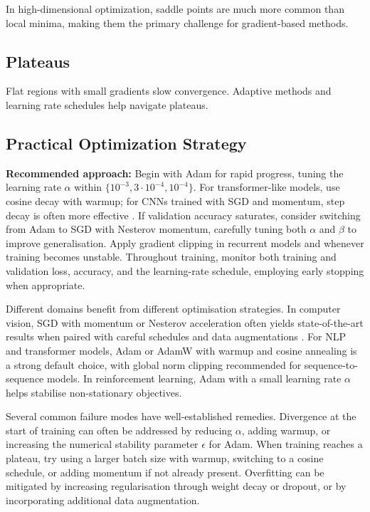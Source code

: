 In high-dimensional optimization, saddle points are much more common than local minima, making them the primary challenge for gradient-based methods.

\subsection{Plateaus}

Flat regions with small gradients slow convergence. Adaptive methods and learning rate schedules help navigate plateaus.

\subsection{Practical Optimization Strategy}

\textbf{Recommended approach:} Begin with Adam \cite{Kingma2014} for rapid progress, tuning the learning rate $\alpha$ within $\{10^{-3},3\cdot10^{-4},10^{-4}\}$. For transformer-like models, use cosine decay with warmup; for CNNs trained with SGD and momentum, step decay is often more effective \cite{WebOptimizationDLBook,D2LChapterOptimization,He2016}. If validation accuracy saturates, consider switching from Adam to SGD with Nesterov momentum, carefully tuning both $\alpha$ and $\beta$ to improve generalisation. Apply gradient clipping in recurrent models and whenever training becomes unstable. Throughout training, monitor both training and validation loss, accuracy, and the learning-rate schedule, employing early stopping when appropriate.

Different domains benefit from different optimisation strategies. In computer vision, SGD with momentum or Nesterov acceleration often yields state-of-the-art results when paired with careful schedules and data augmentations \cite{He2016}. For NLP and transformer models, Adam or AdamW with warmup and cosine annealing is a strong default choice, with global norm clipping recommended for sequence-to-sequence models. In reinforcement learning, Adam with a small learning rate $\alpha$ helps stabilise non-stationary objectives.

Several common failure modes have well-established remedies. Divergence at the start of training can often be addressed by reducing $\alpha$, adding warmup, or increasing the numerical stability parameter \(\epsilon\) for Adam. When training reaches a plateau, try using a larger batch size with warmup, switching to a cosine schedule, or adding momentum if not already present. Overfitting can be mitigated by increasing regularisation through weight decay or dropout, or by incorporating additional data augmentation.
